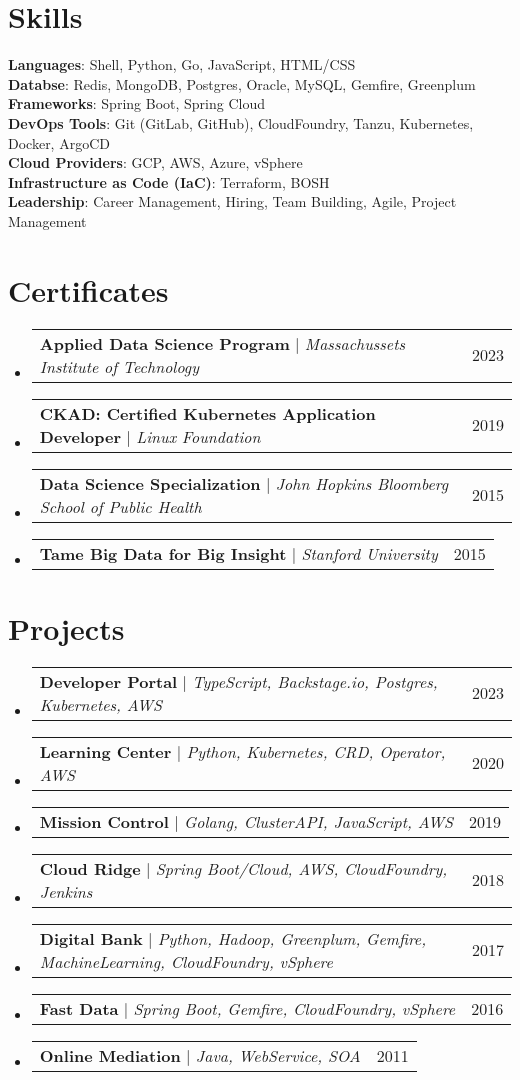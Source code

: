 \documentclass[letterpaper,11pt]{article}
\makeatletter
\newcommand{\resumeProjectHeading}[2]{
    \item
    \begin{tabular*}{0.97\textwidth}{l@{\extracolsep{\fill}}r}
      \small#1 & #2 \\
    \end{tabular*}\vspace{-7pt}
}
\newcommand{\resumeSubHeadingListStart}{\begin{itemize}[leftmargin=0.15in, label={}]}
\newcommand{\resumeSubHeadingListEnd}{\end{itemize}}
\makeatother
\begin{document}
\section{Skills}
 \begin{itemize}[leftmargin=0.15in, label={}]
    \small{\item{
     \textbf{Languages}{: Shell, Python, Go, JavaScript, HTML/CSS} \\
     \textbf{Databse}{: Redis, MongoDB, Postgres, Oracle, MySQL, Gemfire, Greenplum} \\
     \textbf{Frameworks}{: Spring Boot, Spring Cloud} \\
     \textbf{DevOps Tools}{: Git (GitLab, GitHub), CloudFoundry, Tanzu, Kubernetes, Docker, ArgoCD} \\
     \textbf{Cloud Providers}{: GCP, AWS, Azure, vSphere} \\
     \textbf{Infrastructure as Code (IaC)}{: Terraform, BOSH} \\
     \textbf{Leadership}{: Career Management, Hiring, Team Building, Agile, Project Management}
    }}
 \end{itemize}


\section{Certificates}
  \resumeSubHeadingListStart
    \resumeProjectHeading
      {\textbf{Applied Data Science Program} $|$ \emph{Massachussets Institute of Technology}}{2023}
    \resumeProjectHeading
      {\textbf{CKAD: Certified Kubernetes Application Developer} $|$ \emph{Linux Foundation}}{2019}  
    \resumeProjectHeading
      {\textbf{Data Science Specialization} $|$ \emph{John Hopkins Bloomberg School of Public Health}}{2015}
    \resumeProjectHeading
      {\textbf{Tame Big Data for Big Insight} $|$ \emph{Stanford University}}{2015}
  \resumeSubHeadingListEnd


\section{Projects}
  \resumeSubHeadingListStart
    \resumeProjectHeading    
      {\textbf{Developer Portal} $|$ \emph{TypeScript, Backstage.io, Postgres, Kubernetes, AWS}} {2023}  
    \resumeProjectHeading
      {\textbf{Learning Center} $|$ \emph{Python, Kubernetes, CRD, Operator, AWS}} {2020}
    \resumeProjectHeading
      {\textbf{Mission Control} $|$ \emph{Golang, ClusterAPI, JavaScript, AWS}} {2019}
    \resumeProjectHeading  
      {\textbf{Cloud Ridge} $|$ \emph{Spring Boot/Cloud, AWS, CloudFoundry, Jenkins}} {2018}
    \resumeProjectHeading
      {\textbf{Digital Bank} $|$ \emph{Python, Hadoop, Greenplum, Gemfire, MachineLearning, CloudFoundry, vSphere}} {2017}
    \resumeProjectHeading
      {\textbf{Fast Data} $|$ \emph{Spring Boot, Gemfire, CloudFoundry, vSphere}} {2016}
    \resumeProjectHeading
      {\textbf{Online Mediation} $|$ \emph{Java, WebService, SOA}} {2011}
  \resumeSubHeadingListEnd
\end{document}
